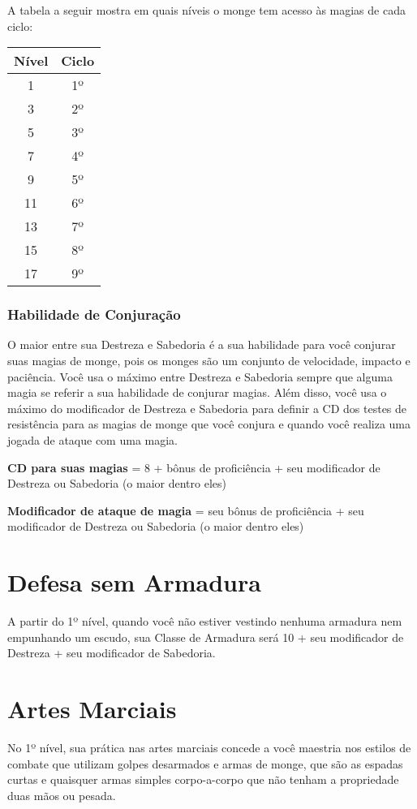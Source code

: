 \begin{multicols}{2}
A tabela a seguir mostra em quais níveis o monge tem acesso às magias de cada
ciclo:

\begin{center}
\begin{tabular}{|||c||c|||}
    \hline
    \textbf{Nível} & \textbf{Ciclo} \\
    \hline
    1 & 1º \\
    \hline
    3 & 2º \\
    \hline
    5 & 3º \\
    \hline
    7 & 4º \\
    \hline
    9 & 5º \\
    \hline
    11 & 6º \\
    \hline
    13 & 7º \\
    \hline
    15 & 8º \\
    \hline
    17 & 9º \\
    \hline
\end{tabular}
\end{center}

\subsubsection*{Habilidade de Conjuração}%

O maior entre sua Destreza e Sabedoria é a sua habilidade para você conjurar
suas magias de monge, pois os monges são um conjunto de velocidade, impacto e
paciência. Você usa o máximo entre Destreza e Sabedoria sempre que alguma magia
se referir a sua habilidade de conjurar magias. Além disso, você usa o máximo do
modificador de Destreza e Sabedoria para definir a CD dos testes de resistência
para as magias de monge que você conjura e quando você realiza uma jogada de
ataque com uma magia.

\begin{center}
\textbf{CD para suas magias} = 8 + bônus de proficiência + seu modificador de
Destreza ou Sabedoria (o maior dentro eles) \nl

\textbf{Modificador de ataque de magia} = seu bônus de proficiência + seu
modificador de Destreza ou Sabedoria (o maior dentro eles)
\end{center}

\section*{Defesa sem Armadura}%

A partir do 1º nível, quando você não estiver vestindo nenhuma armadura nem
empunhando um escudo, sua Classe de Armadura será 10 + seu modificador de
Destreza + seu modificador de Sabedoria.

\section*{Artes Marciais}%

No 1º nível, sua prática nas artes marciais concede a você maestria nos estilos
de combate que utilizam golpes desarmados e armas de monge, que são as espadas
curtas e quaisquer armas simples corpo-a-corpo que não tenham a propriedade duas
mãos ou pesada.

\end{multicols}
